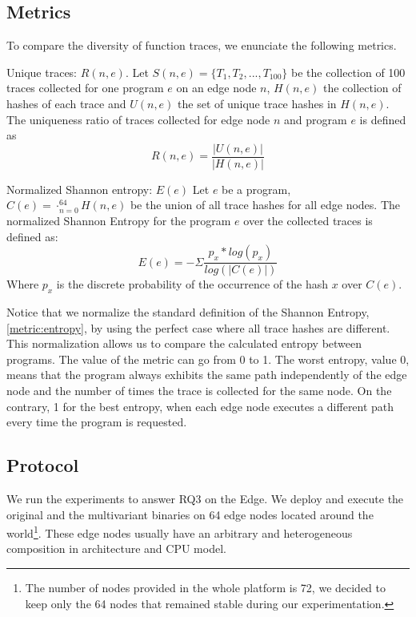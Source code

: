 \subsection*{Metrics}

To compare the diversity of function traces, we enunciate the following metrics.  


\begin{metric}{Unique traces: $R(n, e)$.}\label{metric:ratio:mve}
    Let $S(n, e)=\{T_1, T_2, ..., T_{100}\}$ be the collection of 100 traces collected for one program $e$ on an edge node $n$, $H(n, e)$ the collection of hashes of each trace and $U(n, e)$ the set of unique trace hashes in $H(n,e)$.
    The uniqueness ratio of traces collected for edge node $n$ and program $e$ is defined as
    $$
        R(n,e) = \frac{|U(n,e)|}{|H(n, e)|}
    $$
\end{metric}


\begin{metric}{Normalized Shannon entropy: $E(e)$}\label{metric:entropy}
    Let $e$ be a program, $C(e)=\cdot_{n=0}^{64} H(n, e)$ be the union  of all trace hashes for all edge nodes.
    The normalized Shannon Entropy for the program $e$ over the collected traces is defined as: \\
    $$
        E(e)=-\Sigma \frac{p_x*log(p_x)}{log(|C(e)|)}
    $$
    Where $p_x$ is the discrete probability of the occurrence of the hash $x$ over $C(e)$.
    
\end{metric}

Notice that we normalize the standard definition of the Shannon Entropy, \autoref{metric:entropy}, by using the perfect case where all trace hashes are different. 
This normalization allows us to compare the calculated entropy between programs.
The value of the metric can go from 0 to 1. The worst entropy, value 0, means that the program always exhibits the same path independently of the edge node and the number of times the trace is collected for the same node. On the contrary, 1 for the best entropy, when each edge node executes a different path every time the program is requested.

\subsection*{Protocol}


We run the experiments to answer RQ3 on the Edge. We deploy and execute the original and the multivariant binaries on 64 edge nodes located around the world\footnote{The number of nodes provided in the whole platform is 72, we decided to keep only the 64 nodes that remained stable during our experimentation.}.
These edge nodes usually have an arbitrary and heterogeneous composition in architecture and CPU model.


